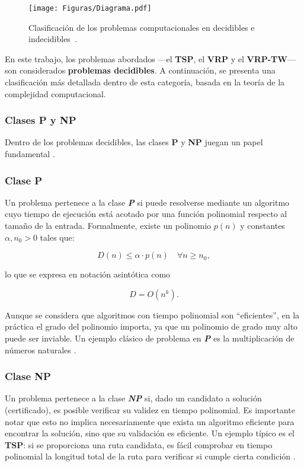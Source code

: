 \documentclass[12pt,titlepage,twoside,openright]{book}
\begin{document}
\begin{figure}[H]
	\centering
	\texttt{[image: Figuras/Diagrama.pdf]}
	\caption{Clasificación de los problemas computacionales en decidibles e indecidibles~\citep{maldonado2013problema}.}
	\label{fig:decidibilidad}
\end{figure}

En este trabajo, los problemas abordados —el \textbf{TSP}, el \textbf{VRP} y el \textbf{VRP-TW}— son considerados \textbf{problemas decidibles}. A continuación, se presenta una clasificación más detallada dentro de esta categoría, basada en la teoría de la complejidad computacional.


\subsubsection{Clases P y NP}

Dentro de los problemas decidibles, las clases \textbf{P} y \textbf{NP} juegan un papel fundamental \citep{maldonado2013problema}.

\subsubsection*{Clase P}
Un problema pertenece a la clase \emph{\textbf{P}} si puede resolverse mediante un algoritmo cuyo tiempo de ejecución está acotado por una función polinomial respecto al tamaño de la entrada. Formalmente, existe un polinomio \(p(n)\) y constantes \(\alpha, n_0 > 0\) tales que:

\[
	D(n) \leq \alpha \cdot p(n) \quad \forall n \geq n_0,
\]

lo que se expresa en notación asintótica como

\[
	D = O(n^k).
\]

Aunque se considera que algoritmos con tiempo polinomial son “eficientes”, en la práctica el grado del polinomio importa, ya que un polinomio de grado muy alto puede ser inviable. Un ejemplo clásico de problema en \emph{\textbf{P}} es la multiplicación de números naturales \citep{Flores2014}.

\subsubsection*{Clase NP}
Un problema pertenece a la clase \emph{\textbf{NP}} si, dado un candidato a solución (certificado), es posible verificar su validez en tiempo polinomial. Es importante notar que esto no implica necesariamente que exista un algoritmo eficiente para encontrar la solución, sino que su validación es eficiente. Un ejemplo típico es el \textbf{TSP}: si se proporciona una ruta candidata, es fácil comprobar en tiempo polinomial la longitud total de la ruta para verificar si cumple cierta condición \citep{Flores2014}.
\end{document}
